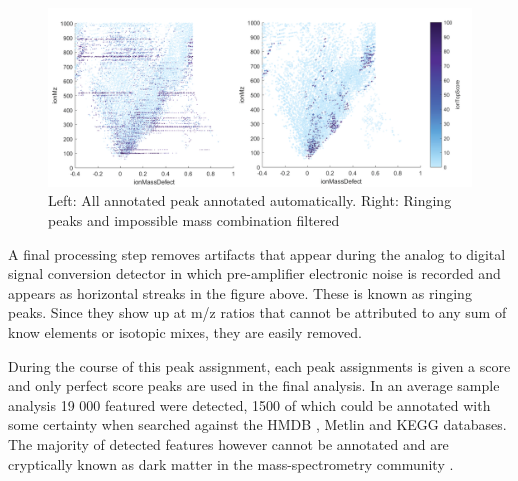 \documentclass[a4paper]{book}
\begin{document}
	\begin{figure}[hb!t]
		\centering
		\includegraphics[width=\linewidth]{3.Metabolomics/Peak_filtering.png}
		{\caption{Left: All annotated peak annotated automatically. Right: Ringing peaks and impossible mass combination filtered}}
		\label{Metabolomics Data Pre-Processing}
	\end{figure}

	A final processing step removes artifacts that appear during the analog to digital signal conversion detector in which pre-amplifier electronic noise is recorded and appears as horizontal streaks in the figure above. These is known as ringing peaks\citep{Goodner1998QuantitationSpectrometry}. Since they show up at m/z ratios that cannot be attributed to any sum of know elements or isotopic mixes, they are easily removed.
	
	During the course of this peak assignment, each peak assignments is given a score and only perfect score peaks are used in the final analysis. In an average sample analysis 19 000 featured were detected, 1500 of which could be annotated with some certainty when searched against the HMDB \citep{Wishart2013HMDB2013}, Metlin\citep{Smith2005METLIN} and KEGG databases\citep{Kanehisa2017}. The majority of detected features however cannot be annotated and are cryptically known as dark matter in the mass-spectrometry community \citep{Aksenov2017GlobalSpectrometry}.
	
\end{document}
